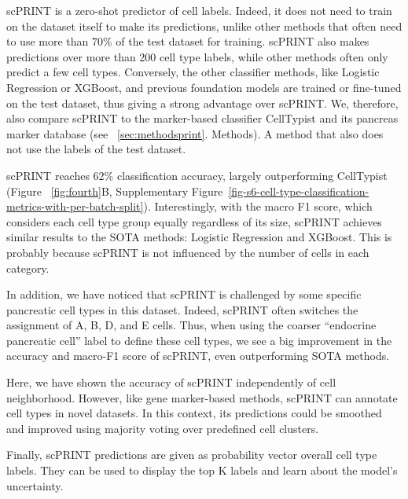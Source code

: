\gls{scPRINT} is a zero-shot predictor of cell labels. Indeed, it does not need to train on the dataset itself to make its predictions, unlike other methods that often need to use more than 70\% of the test dataset for training. \gls{scPRINT} also makes predictions over more than 200 cell type labels, while other methods often only predict a few cell types. Conversely, the other classifier methods, like Logistic Regression or XGBoost, and previous foundation models are trained or fine-tuned on the test dataset, thus giving a strong advantage over \gls{scPRINT}. We, therefore, also compare \gls{scPRINT} to the marker-based classifier CellTypist\citep{condeCrosstissueImmuneCell2022} and its pancreas marker database (see ~\ref{sec:methodsprint}. Methods). A method that also does not use the labels of the test dataset.

\gls{scPRINT} reaches 62\% classification accuracy, largely outperforming CellTypist (Figure ~\ref{fig:fourth}B, Supplementary Figure~\ref{fig-s6-cell-type-classification-metrics-with-per-batch-split}). Interestingly, with the macro F1 score, which considers each cell type group equally regardless of its size, \gls{scPRINT} achieves similar results to the \gls{SOTA}\citep{OpenproblemsbioOpenproblemsv22024} methods: Logistic Regression and XGBoost. This is probably because \gls{scPRINT} is not influenced by the number of cells in each category.

In addition, we have noticed that \gls{scPRINT} is challenged by some specific pancreatic cell types in this dataset. Indeed, \gls{scPRINT} often switches the assignment of A, B, D, and E cells. Thus, when using the coarser “endocrine pancreatic cell” label to define these cell types, we see a big improvement in the accuracy and macro-F1 score of \gls{scPRINT}, even outperforming \gls{SOTA} methods.

Here, we have shown the accuracy of \gls{scPRINT} independently of cell neighborhood. However, like gene marker-based methods, \gls{scPRINT} can annotate cell types in novel datasets. In this context, its predictions could be smoothed and improved using majority voting over predefined cell clusters.

Finally, \gls{scPRINT} predictions are given as probability vector overall cell type labels. They can be used to display the top K labels and learn about the model's uncertainty.

